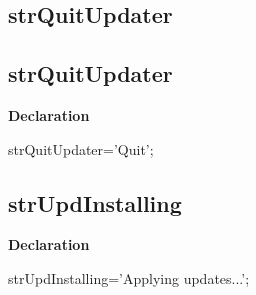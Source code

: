 \documentclass{report}
\newif\ifpdf
\begin{document}
\subsection*{\large{\textbf{strQuitUpdater}}\normalsize\hspace{1ex}\hrulefill}
\else
\subsection*{strQuitUpdater}
\fi
\label{trstrings-strQuitUpdater}
\begin{list}{}{
\setlength{\itemindent}{0cm}
\setlength{\listparindent}{0cm}
\setlength{\leftmargin}{\evensidemargin}
\addtolength{\leftmargin}{\tmplength}
\settowidth{\labelsep}{X}
\addtolength{\leftmargin}{\labelsep}
\setlength{\labelwidth}{\tmplength}
}
\item[\textbf{Declaration}\hfill]
\ifpdf
\begin{flushleft}
\fi
\begin{ttfamily}
strQuitUpdater='Quit';\end{ttfamily}

\ifpdf
\end{flushleft}
\fi

\end{list}
\ifpdf
\subsection*{\large{\textbf{strUpdInstalling}}\normalsize\hspace{1ex}\hrulefill}
\else
\subsection*{strUpdInstalling}
\fi
\label{trstrings-strUpdInstalling}
\begin{list}{}{
\setlength{\itemindent}{0cm}
\setlength{\listparindent}{0cm}
\setlength{\leftmargin}{\evensidemargin}
\addtolength{\leftmargin}{\tmplength}
\settowidth{\labelsep}{X}
\addtolength{\leftmargin}{\labelsep}
\setlength{\labelwidth}{\tmplength}
}
\item[\textbf{Declaration}\hfill]
\ifpdf
\begin{flushleft}
\fi
\begin{ttfamily}
strUpdInstalling='Applying updates...';\end{ttfamily}

\ifpdf
\end{flushleft}
\fi

\end{list}
\ifpdf
\end{document}
